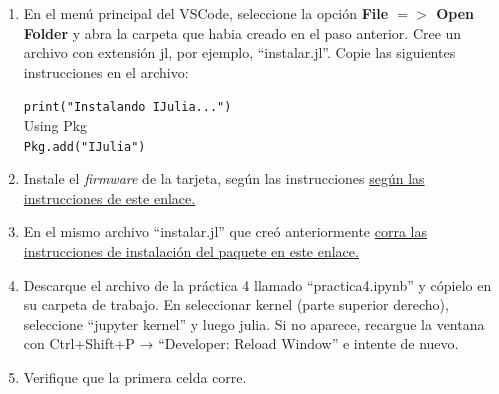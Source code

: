 \documentclass[11pt, a4paper]{article}
\begin{document}
\begin{enumerate}[leftmargin=*]
\item En el menú principal del VSCode, seleccione la opción \textbf{File $=>$ Open Folder} y abra la carpeta que habia creado en el paso anterior. Cree un archivo con extensión jl, por ejemplo, ``instalar.jl''. Copie las siguientes instrucciones en el archivo:

\verb*|print("Instalando IJulia...")|\\
Using Pkg\\
\verb*|Pkg.add("IJulia")|



\item Instale el \emph{firmware} de la tarjeta, según las instrucciones \href{https://nebisman.github.io/DCMotor.jl/dev/instalacion/firmware/#Instalaci%C3%B3n-del-Firmware}{según las instrucciones de este enlace.}  

\item En el mismo archivo ``instalar.jl'' que creó anteriormente \href{https://nebisman.github.io/DCMotor.jl/dev/instalacion/paquete/}{ corra las instrucciones de instalación del paquete en este enlace.}  

\item Descarque el archivo de la práctica 4 llamado ``practica4.ipynb'' y cópielo en su carpeta de trabajo. En seleccionar kernel (parte superior derecho), seleccione ``jupyter kernel'' y luego julia. Si no aparece,  recargue la ventana con Ctrl+Shift+P → ``Developer: Reload Window'' e intente de nuevo.

\item Verifique que la primera celda corre.


		
%		
%		
\end{enumerate}
%	
	
\end{document}
